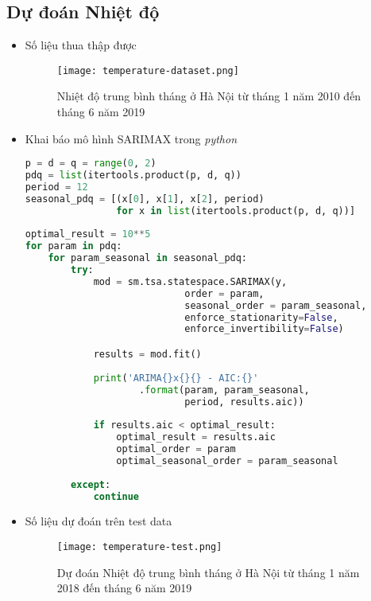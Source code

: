 \documentclass[12pt]{article}
\begin{document}
    \subsection{Dự đoán Nhiệt độ}
    \begin{itemize}
        \item Số liệu thua thập được
            \begin{figure}[H]
                \centering
                \texttt{[image: temperature-dataset.png]}
                \caption{Nhiệt độ trung bình tháng ở Hà Nội từ tháng 1 năm 2010 đến tháng 6 năm 2019}
            \end{figure}
        \item Khai báo mô hình SARIMAX trong \emph{python}
            \begin{lstlisting}[language=Python]
p = d = q = range(0, 2)
pdq = list(itertools.product(p, d, q))
period = 12
seasonal_pdq = [(x[0], x[1], x[2], period)
                for x in list(itertools.product(p, d, q))]
                
optimal_result = 10**5
for param in pdq:
    for param_seasonal in seasonal_pdq:
        try:
            mod = sm.tsa.statespace.SARIMAX(y,
                            order = param,
                            seasonal_order = param_seasonal,
                            enforce_stationarity=False,
                            enforce_invertibility=False)

            results = mod.fit()
            
            print('ARIMA{}x{}{} - AIC:{}'
                    .format(param, param_seasonal,
                            period, results.aic))
            
            if results.aic < optimal_result:
                optimal_result = results.aic
                optimal_order = param
                optimal_seasonal_order = param_seasonal
            
        except:
            continue
            \end{lstlisting}
            
        \item Số liệu dự đoán trên test data
            \begin{figure}[H]
                \centering
                \texttt{[image: temperature-test.png]}
                \caption{Dự đoán Nhiệt độ trung bình tháng ở Hà Nội từ tháng 1 năm 2018 đến tháng 6 năm 2019}
            \end{figure}
            

\end{itemize}
\end{document}

